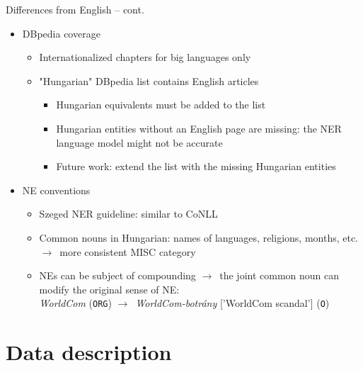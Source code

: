 \documentclass[utf8x,t]{beamer}
\newcommand{\vitem}{\vfill \item}
\newcommand{\nyil}{$\rightarrow$\ }
\begin{document}
\begin{frame}{Differences from English -- cont.}
  \begin{itemize}
  \vitem DBpedia coverage
    \begin{itemize}
    \vitem Internationalized chapters for big languages only
    \vitem "Hungarian" DBpedia list contains English articles %
      \begin{itemize}
      \vitem Hungarian equivalents must be added to the list %
      \vitem Hungarian entities without an English page are missing:
             the NER language model might not be accurate
      \vitem Future work: extend the list with the missing Hungarian entities
      \end{itemize}
    \end{itemize}
  \vitem NE conventions
    \begin{itemize}
    \vitem Szeged NER guideline: similar to CoNLL
    \vitem Common nouns in Hungarian: names of languages, religions, months, etc. \nyil more consistent MISC category
    \vitem NEs can be subject of compounding \nyil the joint common noun can modify the original sense of NE: \\ \textit{WorldCom} (\texttt{ORG}) \nyil \textit{WorldCom-botrány} ['WorldCom scandal'] (\texttt{O})
    \end{itemize}
  \end{itemize}
\end{frame}

\section{Data description}
\end{document}
